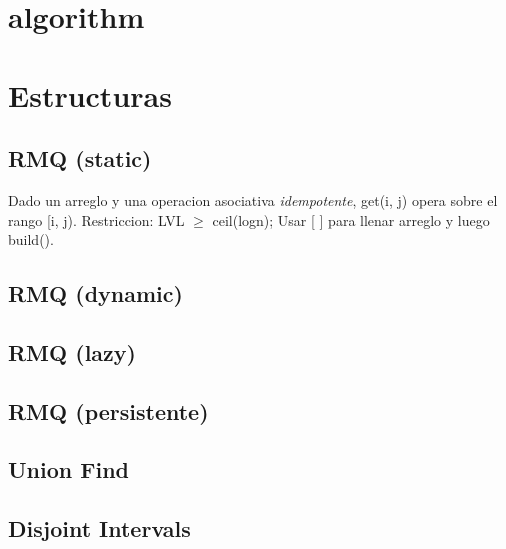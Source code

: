 

\def\title{TicoBits - Universidad de Costa Rica}
\tableofcontents\newpage
 
\section{algorithm}%



\section{Estructuras}%
\subsection{RMQ (static)}
Dado un arreglo y una operacion asociativa \emph{idempotente}, get(i, j) opera sobre el rango [i, j). Restriccion: LVL $\ge$ ceil(logn); Usar [ ] para llenar arreglo y luego build().
\subsection{RMQ (dynamic)}
\subsection{RMQ (lazy)}
\subsection{RMQ (persistente)}
\subsection{Union Find}
\subsection{Disjoint Intervals}
